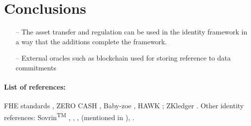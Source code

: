 \section{Conclusions}

	\begin{itemize}
    \item[--] The asset transfer and regulation can be used in the identity framework in a way that the additions complete the framework.
    \item[--] External oracles such as blockchain used for storing reference to data commitments
	\end{itemize}


\paragraph{List of references:}
	FHE standards \cite{2017:applications-of-homomorphic-encryption},
ZERO CASH \cite{2014:SP:Zerocash},
Baby-zoe \cite{2018:github:baby-zoe},
HAWK \red{\cite{}}; %
ZKledger \cite{2018:NSDI:zkLedger}.
	Other identity references:
Sovrin\textsuperscript{TM} \cite{2018:sovrin}, 
\cite{2014:architecture-for-ABC-technologies}, 
\cite{2017:ccs:Practical-UC-Secure-Delegatable-Credentials-with-attributes},
\cite{2017:SP:Accumulators-with-Applications-to-Anonymity-Preserving-Revocation} (mentioned in ),
\cite{2010:SCN:Solving-Revocation-with-Efficient-Update-of-Anonymous-Credentials}.




